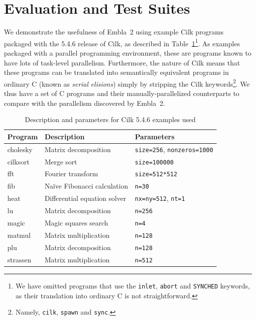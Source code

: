 \section{Evaluation and Test Suites} \label{sresults}

We demonstrate the usefulness of Embla~2 using example Cilk programs packaged with the 5.4.6 release of Cilk,
as described in Table~\ref{cilk-ex}\footnote{We
have omitted programs that use the \texttt{inlet}, \texttt{abort} and \texttt{SYNCHED} keywords,
as their translation into ordinary C is not straightforward.}.
As examples packaged with a parallel programming environment,
these are programs known to have lots of task-level parallelism.
Furthermore, the nature of Cilk means that these programs can be translated into semantically equivalent programs in ordinary C (known as \emph{serial elisions}) simply by stripping the Cilk keywords\footnote{Namely,
\texttt{cilk}, \texttt{spawn} and \texttt{sync}.}.
We thus have a set of C programs and their manually-parallelized counterparts to compare with the parallelism discovered by Embla~2.

\begin{table}[t]
\centering
\scriptsize
\begin{tabular}{ | l | l | l | }
\hline
Program & Description & Parameters \\
\hline
\textsf{cholesky} & Matrix decomposition & \texttt{size=256}, \texttt{nonzeros=1000} \\
\textsf{cilksort} & Merge sort & \texttt{size=100000} \\
\textsf{fft} & Fourier transform & \texttt{size=512*512} \\
\textsf{fib} & Na\"ive Fibonacci calculation & \texttt{n=30} \\
\textsf{heat} & Differential equation solver & \texttt{nx=ny=512}, \texttt{nt=1} \\ 
\textsf{lu} & Matrix decomposition & \texttt{n=256} \\
\textsf{magic} & Magic squares search & \texttt{n=4} \\
\textsf{matmul} & Matrix multiplication & \texttt{n=128} \\
\textsf{plu} & Matrix decomposition & \texttt{n=128} \\
\textsf{strassen} & Matrix multiplication & \texttt{n=512} \\
\hline
\end{tabular}
\small
\label{cilk-ex}
\caption{Description and parameters for Cilk 5.4.6 examples used}
\end{table}

